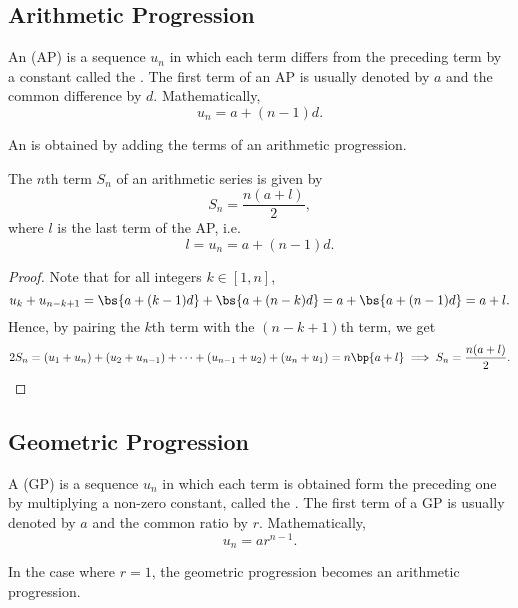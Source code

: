 \subsection{Arithmetic Progression}

\begin{definition}
    An  (AP) is a sequence $u_n$ in which each term differs from the preceding term by a constant called the . The first term of an AP is usually denoted by $a$ and the common difference by $d$. Mathematically, \[u_n = a + (n-1)d.\]
\end{definition}

\begin{definition}
    An  is obtained by adding the terms of an arithmetic progression.
\end{definition}

\begin{proposition}
    The $n$th term $S_n$ of an arithmetic series is given by \[S_n = \frac{n(a + l)}{2},\] where $l$ is the last term of the AP, i.e. \[l = u_n = a + (n-1) d.\]
\end{proposition}
\begin{proof}
    Note that for all integers $k \in [1, n]$, \[u_k + u_{n - k + 1} = \bs{a + (k-1)d} + \bs{a + (n-k)d} = a + \bs{a + (n-1)d} = a + l.\] Hence, by pairing the $k$th term with the $(n-k+1)$th term, we get \[2S_n = (u_1 + u_n) + (u_2 + u_{n-1}) + \dots + (u_{n-1} + u_2) + (u_n + u_1) = n\bp{a + l} \implies S_n = \frac{n(a + l)}{2}.\]
\end{proof}

\subsection{Geometric Progression}

\begin{definition}
    A  (GP) is a sequence $u_n$ in which each term is obtained form the preceding one by multiplying a non-zero constant, called the . The first term of a GP is usually denoted by $a$ and the common ratio by $r$. Mathematically, \[u_n = ar^{n-1}.\]
\end{definition}

\begin{remark}
    In the case where $r = 1$, the geometric progression becomes an arithmetic progression.
\end{remark}

